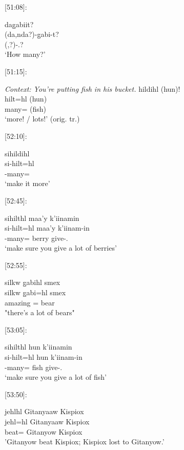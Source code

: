 [51:08]:
\begin{exe}
    \ex \glll
    dag̱abiit? \\ 
    (da,nda?)-g̱abi-t? \\
    (\Pl,\Wh?)-.\Ii? \\
    \glt `How many?'
\end{exe}

[51:15]:
\begin{exe}
    \ex \textit{Context: You're putting fish in his bucket.} 
    \glll
    hildihl (hun)! \\
    hilt=hl (hun) \\
    many=\Cn{} (fish) \\
    \glt `more! / lots!' (orig. tr.)
\end{exe}

[52:10]:
\begin{exe}
    \ex \glll
    sihildihl \\
    si-hilt=hl \\
    -many=\Cn \\
    \glt `make it more'
\end{exe}

[52:45]:
\begin{exe}
    \ex \glll
    sihilthl maa'y k'iinamin \\
    si-hilt=hl maa'y k'iinam-in \\
    -many=\Cn{} berry give-\Ssg.\Ii \\
    \glt `make sure you give a lot of berries'
\end{exe}

[52:55]:
\begin{exe}
    \ex \glll
    silkw g̱abihl smex \\
    silkw g̱abi=hl smex \\
    amazing \Cnt=\Cn{} bear \\
    \glt "there's a lot of bears"
\end{exe}

[53:05]:
\begin{exe}
    \ex \glll
    sihilthl hun k'iinamin \\
    si-hilt=hl hun k'iinam-in \\
    -many=\Cn{} fish give-\Ssg.\Ii \\
    \glt `make sure you give a lot of fish'
\end{exe}

[53:50]: \begin{exe}
    \ex \glll
    jehlhl Gitanyaaw Kispiox  \\ 
    jehl=hl Gitanyaaw Kispiox  \\ 
    beat=\Cn{} Gitanyow Kispiox \\
    \glt 'Gitanyow beat Kispiox; Kispiox lost to Gitanyow.' 
\end{exe}

